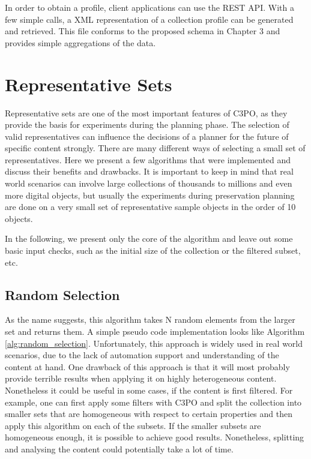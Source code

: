 In order to obtain a profile, client applications can use the REST API. With a few simple calls, a XML representation of a collection profile can be generated and retrieved. This file conforms to the proposed schema in Chapter 3 and provides simple aggregations of the data.
 
\section{Representative Sets}
Representative sets are one of the most important features of C3PO, as they provide the basis for experiments during the planning phase. The selection of valid representatives can influence the decisions of a planner for the future of specific content strongly. There are many different ways of selecting a small set of representatives.
Here we present a few algorithms that were implemented and discuss their benefits and drawbacks. It is important to keep in mind that real world scenarios can involve large collections of thousands to millions and even more digital objects, but usually the experiments during preservation planning are done on a very small set of representative sample objects in the order of 10 objects.

In the following, we present only the core of the algorithm and leave out some basic input checks, such as the initial size of the collection or the filtered subset, etc.

\subsection{Random Selection}
As the  name suggests, this algorithm takes N random elements from the larger set and returns them. A simple pseudo code implementation looks like Algorithm \ref{alg:random_selection}. Unfortunately, this approach is widely used in real world scenarios, due to the lack of automation support and understanding of the content at hand. One drawback of this approach is that it will most probably provide terrible results when applying it on highly heterogeneous content.
Nonetheless it could be useful in some cases, if the content is first filtered. For example, one can first apply some filters with C3PO and split the collection into smaller sets that are homogeneous with respect to certain properties and then apply this algorithm on each of the subsets. If the smaller subsets are homogeneous enough, it is possible to achieve good results. Nonetheless, splitting and analysing the content could potentially take a lot of time.


